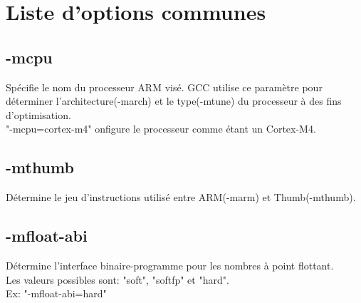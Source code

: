 \documentclass[headings=appendixprefix]{scrreprt}
\begin{document}
\renewcommand{\contentsname}
{\Large Options de compilation pour un projet STM32 de base}

{ \tableofcontents}\thispagestyle{empty}

\clearpage{} %


\chapter{Liste d'options communes}
\setcounter{secnumdepth}{0}


\section{-mcpu}
Spécifie le nom du processeur ARM visé. GCC utilise ce paramètre pour déterminer l'architecture(-march) et le type(-mtune) du processeur à des fins d'optimisation.\\

"-mcpu=cortex-m4" onfigure le processeur comme étant un Cortex-M4.\\


\section{-mthumb}
Détermine le jeu d'instructions utilisé entre ARM(-marm) et Thumb(-mthumb).\\


\section{-mfloat-abi}
Détermine l'interface binaire-programme pour les nombres à point flottant.\\

Les valeurs possibles sont: "soft", "softfp" et "hard".\\
Ex: "-mfloat-abi=hard"\\
\end{document}
